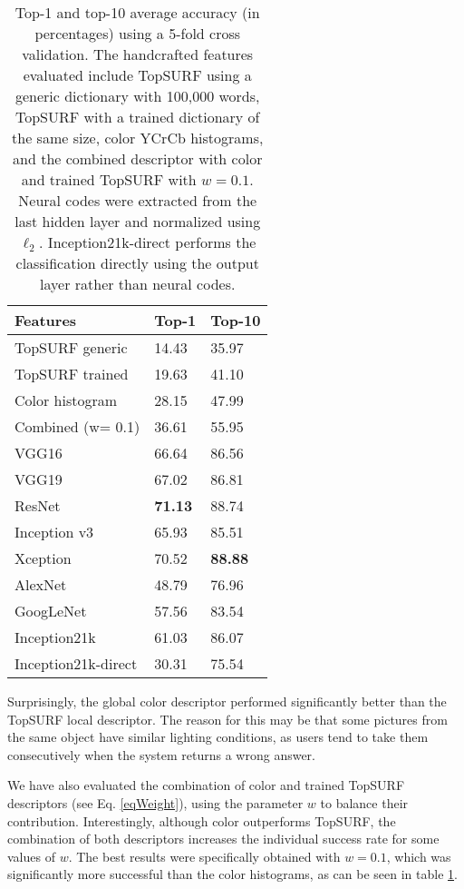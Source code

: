 \documentclass[final, twocolumn]{elsarticle}
\begin{document}
\begin{table}
\centering
\begin{tabular}{l|ll}
\hline
\textbf{Features} 	& \textbf{Top-1} & \textbf{Top-10} \\ \hline
TopSURF generic 	& 14.43 		&35.97 \\
TopSURF trained 	& 19.63 		& 41.10 \\
Color histogram 	& 28.15 		&47.99 \\
Combined (w= 0.1) 	& 36.61 		& 55.95 \\ \hline
VGG16				& 66.64 		&86.56 \\
VGG19				& 67.02 		&86.81 \\
ResNet				& \textbf{71.13} & 88.74 \\
Inception v3		& 65.93 		&85.51 \\
Xception			& 70.52 		& \textbf{88.88} \\
AlexNet				& 48.79 		&76.96 \\
GoogLeNet			& 57.56 		&83.54 \\
Inception21k 		& 61.03 		&86.07 \\
Inception21k-direct & 30.31 		& 75.54 \\
\hline
\end{tabular}
\caption{Top-1 and top-10 average accuracy (in percentages) using a 5-fold cross validation. The handcrafted features evaluated include TopSURF using a generic dictionary with 100,000 words, TopSURF with a trained dictionary of the same size, color YCrCb histograms, and the combined descriptor with color and trained TopSURF with $w=0.1$. Neural codes were extracted from the last hidden layer and normalized using $\ell_2$. Inception21k-direct performs the classification directly using the output layer rather than neural codes.}
\label{Tab2}
\end{table}

Surprisingly, the global color descriptor performed significantly better than the TopSURF local descriptor. The reason for this may be that some pictures from the same object have similar lighting conditions, as users tend to take them consecutively when the system returns a wrong answer.

We have also evaluated the combination of color and trained TopSURF descriptors (see Eq. \ref{eqWeight}), using the parameter $w$ to balance their contribution. Interestingly, although color outperforms TopSURF, the  combination of both descriptors increases the individual  success rate for some values of $w$. The best results were specifically obtained with $w=0.1$, which was significantly more successful than the color histograms, as can be seen in table \ref{Tab2}.
\end{document}
